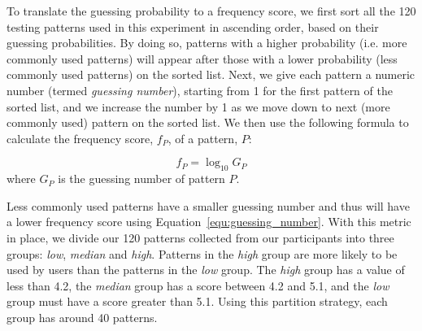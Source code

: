 

          To translate the guessing probability to a frequency score, we first sort all the 120 testing patterns used
          in this experiment in ascending order, based on their guessing probabilities. By doing so, patterns with a
          higher probability (i.e. more commonly used patterns) will appear after those with a lower probability (less commonly
          used patterns) on the sorted list. Next, we give each pattern a numeric number (termed \emph{guessing number}), starting from 1 for
          the first pattern of the sorted list, and we increase the number by 1 as we move down to next (more commonly used) pattern on the sorted list. We then use the following
          formula to calculate the frequency score, $f_{P}$, of a pattern, $P$:

        \begin{equation}
            f_{P}=\log_{10} {G_P}
            \label{equ:guessing_number}
        \end{equation}
        where $G_P$ is the guessing number of pattern $P$.


            Less commonly used patterns have a smaller guessing number and thus will have a lower frequency score using Equation~\ref{equ:guessing_number}. With
            this metric in place, we divide our 120 patterns collected from our participants into three groups:
            \emph{low}, \emph{median} and \emph{high}. Patterns in the \emph{high} group are more likely to be used by users than the patterns in the
            \emph{low} group. The \emph{high} group has a value of less than 4.2, the \emph{median} group
            has a score between 4.2 and 5.1, and the \emph{low} group must have a score greater than 5.1.
            Using this partition strategy, each group has around 40 patterns.

